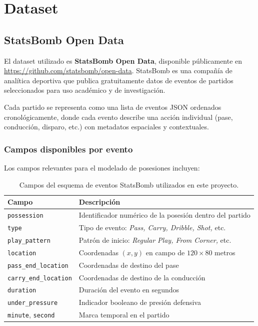 \documentclass[12pt,a4paper]{article}
\newcommand{\code}[1]{\texttt{\small #1}}
\begin{document}
\section{Dataset}

\subsection{StatsBomb Open Data}

El dataset utilizado es \textbf{StatsBomb Open Data}, disponible públicamente en
\url{https://github.com/statsbomb/open-data}. StatsBomb es una compañía de
analítica deportiva que publica gratuitamente datos de eventos de partidos
seleccionados para uso académico y de investigación.

Cada partido se representa como una lista de eventos JSON ordenados cronológicamente,
donde cada evento describe una acción individual (pase, conducción, disparo, etc.)
con metadatos espaciales y contextuales.

\subsubsection{Campos disponibles por evento}

Los campos relevantes para el modelado de posesiones incluyen:

\begin{table}[H]
\centering
\caption{Campos del esquema de eventos StatsBomb utilizados en este proyecto.}
\begin{tabularx}{\linewidth}{lX}
\toprule
\textbf{Campo} & \textbf{Descripción} \\
\midrule
\code{possession}         & Identificador numérico de la posesión dentro del partido \\
\code{type}               & Tipo de evento: \textit{Pass, Carry, Dribble, Shot,} etc. \\
\code{play\_pattern}      & Patrón de inicio: \textit{Regular Play, From Corner,} etc. \\
\code{location}           & Coordenadas $(x, y)$ en campo de $120 \times 80$ metros \\
\code{pass\_end\_location}& Coordenadas de destino del pase \\
\code{carry\_end\_location}& Coordenadas de destino de la conducción \\
\code{duration}           & Duración del evento en segundos \\
\code{under\_pressure}    & Indicador booleano de presión defensiva \\
\code{minute}, \code{second} & Marca temporal en el partido \\
\bottomrule
\end{tabularx}
\label{tab:event_fields}
\end{table}
\end{document}

